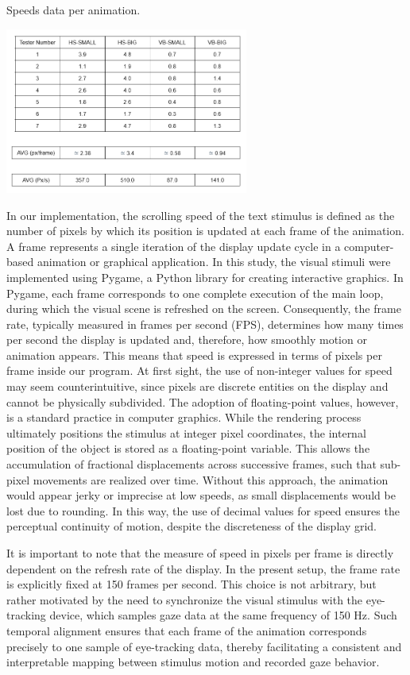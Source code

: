 \documentclass[12pt]{report}
\begin{document}
\begin{table}[ht]
    \centering
    \caption{Speeds data per animation.} %
    \includegraphics[width=0.6\textwidth]{Images/Experiment/speeds.png}
    \label{tab:sped}
\end{table}


In our implementation, the scrolling speed of the text stimulus is defined as the number of pixels by which its position is updated at each frame of the animation.
A frame represents a single iteration of the display update cycle in a computer-based animation or graphical application. 
In this study, the visual stimuli were implemented using Pygame, a Python library for creating interactive graphics.
In Pygame, each frame corresponds to one complete execution of the main loop, during which the visual scene is refreshed on the screen. 
Consequently, the frame rate, typically measured in frames per second (FPS), determines how many times per second the display is updated and, therefore, how smoothly motion or animation appears.
This means that speed is expressed in terms of pixels per frame inside our program. 
At first sight, the use of non-integer values for speed may seem counterintuitive, since pixels are discrete entities on the display and cannot be physically subdivided. 
The adoption of floating-point values, however, is a standard practice in computer graphics. 
While the rendering process ultimately positions the stimulus at integer pixel coordinates, the internal position of the object is stored as a floating-point variable. 
This allows the accumulation of fractional displacements across successive frames, such that sub-pixel movements are realized over time. 
Without this approach, the animation would appear jerky or imprecise at low speeds, as small displacements would be lost due to rounding. 
In this way, the use of decimal values for speed ensures the perceptual continuity of motion, despite the discreteness of the display grid.

It is important to note that the measure of speed in pixels per frame is directly dependent on the refresh rate of the display. 
In the present setup, the frame rate is explicitly fixed at 150 frames per second. 
This choice is not arbitrary, but rather motivated by the need to synchronize the visual stimulus with the eye-tracking device, which samples gaze data at the same frequency of 150 Hz. 
Such temporal alignment ensures that each frame of the animation corresponds precisely to one sample of eye-tracking data, thereby facilitating a consistent and interpretable mapping between stimulus motion and recorded gaze behavior.
\end{document}

